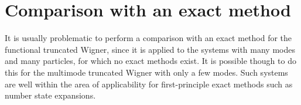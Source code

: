 \section{Comparison with an exact method}
\label{sec:wigner-bec:mm}

It is usually problematic to perform a comparison with an exact method for the functional truncated Wigner, since it is applied to the systems with many modes and many particles, for which no exact methods exist.
It is possible though to do this for the multimode truncated Wigner with only a few modes.
Such systems are well within the area of applicability for first-principle exact methods such as number state expansions.

